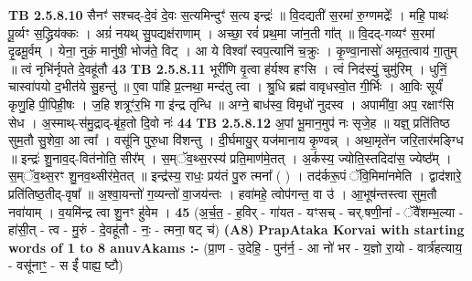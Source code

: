 \documentclass[17pt]{extarticle}
\begin{document}
                  \newline
                                \textbf{ TB 2.5.8.10} \newline
                  सैनꣳ॑ सश्चद्-दे॒वं दे॒वः स॒त्यमिन्दुꣳ॑ स॒त्य इन्द्रः॑ ॥ वि॒दद्यती॑ स॒रमा॑ रु॒ग्णमद्रेः᳚ । महि॒ पाथः॑ पू॒र्व्यꣳ स॒द्ध्रिय॑क्कः । अग्रं॑ नयथ् सु॒पद्यक्ष॑राणाम् । अच्छा॒ रवं॑ प्रथ॒मा जा॑न॒ती गा᳚त् ॥ वि॒दद्-गव्यꣳ॑ स॒रमा॑ दृ॒ढमू॒र्वम् । येना॒ नुकं॒ मानु॑षी॒ भोज॑ते॒ विट् । आ ये विश्वा᳚ स्वप॒त्यानि॑ च॒क्रुः । कृ॒ण्वा॒नासो॑ अमृत॒त्वाय॑ गा॒तुम् ॥ त्वं नृभि॑र्नृपते दे॒वहू॑तौ \textbf{ 43} \newline
                  \newline
                                \textbf{ TB 2.5.8.11} \newline
                  भूरी॑णि वृ॒त्वा ह॑र्यश्व हꣳसि । त्वं निद॑स्युं॒ चुमु॑रिम् । धुनिं॒ चास्वा॑पयो द॒भीत॑ये सु॒हन्तु॑ ॥ ए॒वा पा॑हि प्र॒त्नथा॒ मन्द॑तु त्वा । श्रु॒धि ब्रह्म॑ वावृधस्वो॒त गी॒र्भिः । आ॒विः सूर्यं॑ कृणु॒हि पी॒पिही॒षः । ज॒हि शत्रूꣳ॑र॒भि गा इ॑न्द्र तृन्धि ॥ अग्ने॒ बाध॑स्व॒ विमृधो॑ नुदस्व । अपामी॑वा॒ अप॒ रक्षाꣳ॑सि सेध । अ॒स्माथ्-स॑मु॒द्राद्-बृ॑ह॒तो दि॒वो नः॑ \textbf{ 44} \newline
                  \newline
                                \textbf{ TB 2.5.8.12} \newline
                  अ॒पां भू॒मान॒मुप॑ नः सृजे॒ह ॥ यज्ञ्॒ प्रति॑तिष्ठ सुम॒तौ सु॒शेवा॒ आ त्वा᳚ । वसू॑नि पुरु॒धा वि॑शन्तु । दी॒र्घमायु॒र् यज॑मानाय कृ॒ण्वन्न् । अथा॒मृते॑न जरि॒तार॑मङ्ग्धि ॥ इन्द्रः॑ शु॒नाव॒द्-वित॑नोति॒ सीर᳚म् । स॒म्ॅव॒थ्स॒रस्य॑ प्रति॒माण॑मे॒तत् । अ॒र्कस्य॒ ज्योति॒स्तदिदा॑स॒ ज्येष्ठ᳚म् । स॒म्ॅव॒थ्स॒रꣳ शु॒नव॒थ्सीर॑मे॒तत् ॥ इन्द्र॑स्य॒ राधः॒ प्रय॑तं पु॒रु त्मना᳚ ( ) । तद॑र्करू॒पं ॅवि॒मिमा॑नमेति । द्वाद॑शारे॒ प्रति॑तिष्ठ॒तीद्-वृषा᳚ ॥ अ॒श्वा॒यन्तो॑ ग॒व्यन्तो॑ वा॒जय॑न्तः । हवा॑महे॒ त्वोप॑गन्त॒ वा उ॑ । आ॒भूष॑न्तस्त्वा सुम॒तौ नवा॑याम् । व॒यमि॑न्द्र त्वा शु॒नꣳ हु॑वेम । \textbf{ 45} \newline
                  \newline
                                    (अ॒र्च॒त॒ - ह॒विर् - गा॑यत - यꣳसच् - चर्.षणी॒नां - ॅवै॑शम्भ॒ल्या - हा॑सी॒त् - त्व - मु॒रुं - दे॒वहू॑तौ - नः॒ - त्मना॒ षट् च॑) \textbf{(A8)} \newline \newline
                \textbf{PrapAtaka Korvai with starting  words of 1 to 8 anuvAkams :-} \newline
        (प्रा॒ण - उ॒देहि॒ - पुन॑र्न॒ - आ नो॑ भर - य॒ज्ञो रा॒यो - वार्त्र॑हत्याय॒ - वसू॑नाꣳ॒॒ - स ईं॑ पाह्य॒ ष्टौ) \newline
\end{document}
